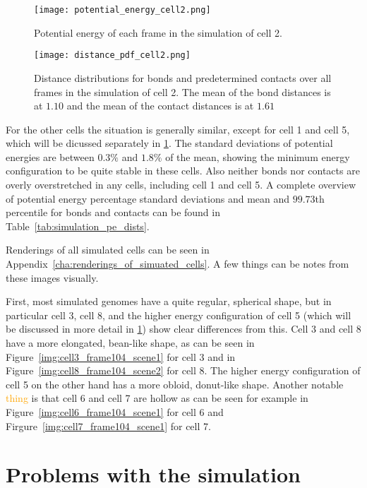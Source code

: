 \begin{figure}[ht]
\centering
  \texttt{[image: potential\_energy\_cell2.png]}
  \caption{Potential energy of each frame in the simulation of cell 2.}
  \label{fig:potential_energy_cell2}
\end{figure}

\begin{figure}[ht]
\centering
  \texttt{[image: distance\_pdf\_cell2.png]}
  \caption{Distance distributions for bonds and predetermined contacts over all frames in the simulation of cell 2. The mean of the bond distances is at \(\num{1.10}\) and the mean of the contact distances is at \(\num{1.61}\)}
  \label{fig:distance_pdf_cell2}
\end{figure}

For the other cells the situation is generally similar, except for cell 1 and cell 5, which will be dicussed separately in \ref{sec:problems_with_the_simulation}. The standard deviations of potential energies are between \(0.3\%\) and \(1.8\%\) of the mean, showing the minimum energy configuration to be quite stable in these cells. Also neither bonds nor contacts are overly overstretched in any cells, including cell 1 and cell 5. A complete overview of potential energy percentage standard deviations and mean and \(99.73\)th percentile for bonds and contacts can be found in Table~\ref{tab:simulation_pe_dists}.

Renderings of all simulated cells can be seen in Appendix~\ref{cha:renderings_of_simuated_cells}. A few things can be notes from these images visually.

First, most simulated genomes have a quite regular, spherical shape, but in particular cell 3, cell 8, and the higher energy configuration of cell 5 (which will be discussed in more detail in \ref{sec:problems_with_the_simulation}) show clear differences from this. Cell 3 and cell 8 have a more elongated, bean-like shape, as can be seen in Figure~\ref{img:cell3_frame104_scene1} for cell 3 and in Figure~\ref{img:cell8_frame104_scene2} for cell 8. The higher energy configuration of cell 5 on the other hand has a more obloid, donut-like shape. Another notable \textcolor{orange}{thing} is that cell 6 and cell 7 are hollow as can be seen for example in Figure~\ref{img:cell6_frame104_scene1} for cell 6 and Firgure~\ref{img:cell7_frame104_scene1} for cell 7.


\section{Problems with the simulation} %
\label{sec:problems_with_the_simulation}


